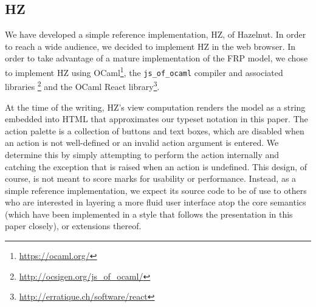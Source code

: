 \subsection{HZ}
We have developed a simple reference implementation, HZ, of Hazelnut.
In order to reach a wide audience, we decided to implement HZ in the web browser.
In order to take advantage of a mature implementation of the FRP model, we chose to implement HZ using OCaml\footnote{\url{https://ocaml.org/}}, the \texttt{js\_of\_ocaml} compiler and associated libraries \cite{DBLP:conf/ml/Balat06}\footnote{\url{http://ocsigen.org/js\_of\_ocaml/}} and the OCaml React library\footnote{\url{http://erratique.ch/software/react}}.

At the time of the writing, 
HZ's view computation renders the model as a string embedded into HTML that approximates our typeset notation in this paper. The action palette is a collection of buttons and text boxes, which are disabled when an action is not well-defined or an invalid action argument is entered. We determine this by simply attempting to perform the action internally and catching the exception that is raised when an action is undefined. This design, of course, is not meant to score marks for usability or performance. Instead, as a simple reference implementation, we expect its source code to be of use to others who are interested in layering a more fluid user interface atop the core semantics (which have been implemented in a style that follows the presentation in this paper closely), or extensions thereof.
